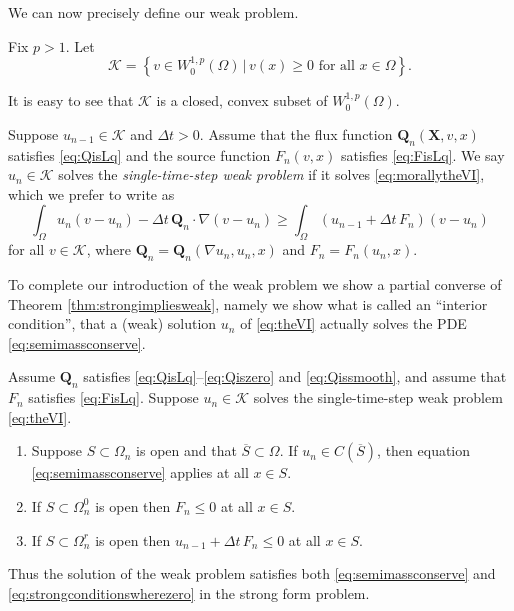 \documentclass[final,leqno,onefignum,onetabnum]{siamltex1213bueler}
\newcommand\bQ{\mathbf{Q}}
\newcommand\bX{\mathbf{X}}
\renewcommand{\grad}{\nabla}
\begin{document}
\medskip
We can now precisely define our weak problem.

\medskip
\begin{definition}  Fix $p>1$.  Let
    $$\mathcal{K} = \left\{v \in W_0^{1,p}(\Omega) \,\big|\, v(x) \ge 0 \text{ for all } x \in \Omega\right\}.$$
\end{definition}
It is easy to see that $\mathcal{K}$ is a closed, convex subset of $W_0^{1,p}(\Omega)$.  

\medskip
\begin{definition}  Suppose $u_{n-1}\in\mathcal{K}$ and $\Delta t>0$.  Assume that the flux function $\bQ_n(\bX,v,x)$ satisfies \eqref{eq:QisLq} and the source function $F_n(v,x)$ satisfies \eqref{eq:FisLq}.  We say $u_n \in \mathcal{K}$ solves the \emph{single-time-step weak problem} if it solves \eqref{eq:morallytheVI}, which we prefer to write as
\begin{equation}
\int_{\Omega} u_n (v-u_n) - \Delta t\, \bQ_n \cdot \grad(v-u_n) \ge \int_{\Omega} \left(u_{n-1} + \Delta t\, F_n\right) (v-u_n)  \label{eq:theVI}
\end{equation}
for all $v \in \mathcal{K}$, where $\bQ_n=\bQ_n(\grad u_n,u_n,x)$ and $F_n = F_n(u_n,x)$.
\end{definition}

\medskip
To complete our introduction of the weak problem we show a partial converse of Theorem \ref{thm:strongimpliesweak}, namely we show what is called an ``interior condition'', that a (weak) solution $u_n$ of \eqref{eq:theVI} actually solves the PDE \eqref{eq:semimassconserve}.

\medskip
\begin{theorem} \label{thm:weakimpliesstrong}  Assume $\bQ_n$ satisfies \eqref{eq:QisLq}--\eqref{eq:Qiszero} and \eqref{eq:Qissmooth}, and assume that $F_n$ satisfies \eqref{eq:FisLq}.  Suppose $u_n\in\mathcal{K}$ solves the single-time-step weak problem \eqref{eq:theVI}.
\renewcommand{\labelenumi}{\emph{(\roman{enumi})}}
\begin{enumerate}
\item Suppose $S \subset \Omega_n$ is open and that $\overline{S}\subset \Omega$.  If $u_n\in C(\overline{S})$, then equation \eqref{eq:semimassconserve} applies at all $x\in S$.
\item If $S \subset \Omega_n^0$ is open then $F_n \le 0$ at all $x\in S$.
\item If $S \subset \Omega_n^r$ is open then $u_{n-1} + \Delta t\,F_n \le 0$ at all $x\in S$.
\end{enumerate}
Thus the solution of the weak problem satisfies both \eqref{eq:semimassconserve} and \eqref{eq:strongconditionswherezero} in the strong form problem.
\end{theorem}
\end{document}
